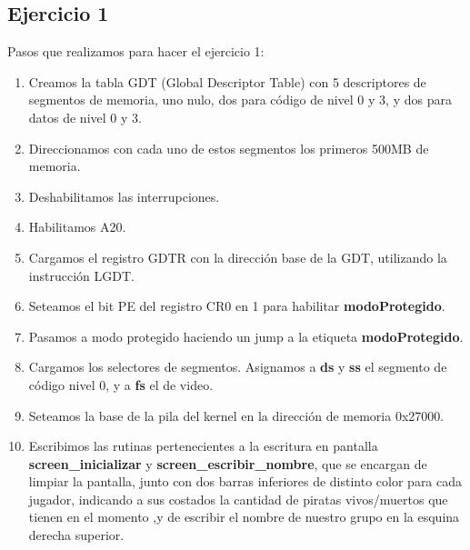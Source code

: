 \documentclass[a4paper,10pt]{article}
\begin{document}
\subsection{Ejercicio 1}
Pasos que realizamos para hacer el ejercicio 1:
\begin{enumerate}
  \item Creamos la tabla GDT (Global Descriptor Table) con 5 descriptores de segmentos de memoria, uno nulo, dos para código de nivel 0 y 3, y dos para datos de nivel 0 y 3.
  \item Direccionamos con cada uno de estos segmentos los primeros 500MB de memoria.
  \item Deshabilitamos las interrupciones.
  \item Habilitamos A20.
  \item Cargamos el registro GDTR con la dirección base de la GDT, utilizando la instrucción LGDT.
  \item Seteamos el bit PE del registro CR0 en 1 para habilitar \textbf{modoProtegido}.
  \item Pasamos a modo protegido haciendo un jump a la etiqueta \textbf{modoProtegido}.
  \item Cargamos los selectores de segmentos. Asignamos a \textbf{ds} y \textbf{ss} el segmento de código nivel 0, y a \textbf{fs} el de video.
  \item Seteamos la base de la pila del kernel en la dirección de memoria 0x27000.
  \item Escribimos las rutinas pertenecientes a la escritura en pantalla \textbf{screen\_inicializar} y \textbf{screen\_escribir\_nombre}, que se encargan de limpiar la pantalla,
    junto con dos barras inferiores de distinto color para cada jugador, indicando a sus costados 
    la cantidad de piratas vivos/muertos que tienen en el momento
    ,y de escribir el nombre de nuestro grupo en la esquina derecha superior. 
\end{enumerate}
\end{document}
